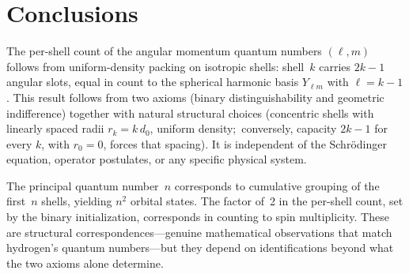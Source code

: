 \documentclass[aps,prl,reprint,amsmath,amssymb]{revtex4-2}
\begin{document}
\section{Conclusions}
\label{sec:conclusions}

The per-shell count of the angular momentum quantum numbers $(\ell, m)$
follows from uniform-density packing on isotropic shells: shell~$k$
carries $2k - 1$ angular slots, equal in count to the spherical harmonic basis
$Y_{\ell m}$ with $\ell = k - 1$.  This result follows from two
axioms (binary distinguishability and geometric indifference) together
with natural structural choices (concentric shells with linearly
spaced radii $r_k = k\,d_0$, uniform density;\ conversely, capacity
$2k - 1$ for every $k$, with $r_0 = 0$, forces that spacing).
It is independent of the Schr\"odinger equation, operator postulates,
or any specific physical system.

The principal quantum number~$n$ corresponds to cumulative grouping of
the first~$n$ shells, yielding $n^2$ orbital states.  The factor of~2
in the per-shell count, set by the binary initialization, corresponds
in counting to spin multiplicity.
These are structural correspondences---genuine mathematical
observations that match hydrogen's quantum numbers---but they depend
on identifications beyond what the two axioms alone determine.
\end{document}
